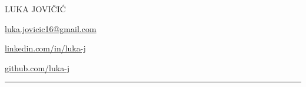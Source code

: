 \begin{center}
{\headerFont\extraLight LUKA \light JOVIČIĆ}
\end{center}
%
%
\begin{center}
\begin{minipage}[b]{\iconsMinipageWidth} %
\faEnvelope\hspace{\iconSpaceBetweenText}\href{mailto:luka.jovicic16+cv@gmail.com}{luka.jovicic16@gmail.com}
\end{minipage}%
\begin{minipage}[b]{\iconsMinipageWidth}
\begin{center}
\faLinkedin\hspace{\iconSpaceBetweenText}\href{https://linkedin.com/in/luka-j}{linkedin.com/in/luka-j}
\end{center}
\end{minipage}%
\begin{minipage}[b]{\iconsMinipageWidth}
\alignRight\faGithub\hspace{\iconSpaceBetweenText}\href{https://github.com/luka-j}{github.com/luka-j}
\end{minipage}\newline%
%
\end{center}

\vspace{-1cm}
\noindent
\hspace{-0.33in}
\rule{1.1\linewidth}{0.2mm}
\vspace{0.2cm}